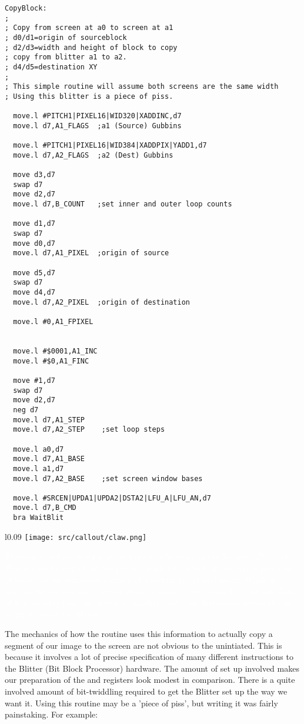 \clearpage
\begin{lstlisting}[escapechar=\%]
CopyBlock:
;
; Copy from screen at a0 to screen at a1
; d0/d1=origin of sourceblock
; d2/d3=width and height of block to copy
; copy from blitter a1 to a2.
; d4/d5=destination XY
;
; This simple routine will assume both screens are the same width
; Using this blitter is a piece of piss.

  move.l #PITCH1|PIXEL16|WID320|XADDINC,d7
  move.l d7,A1_FLAGS  ;a1 (Source) Gubbins

  move.l #PITCH1|PIXEL16|WID384|XADDPIX|YADD1,d7
  move.l d7,A2_FLAGS  ;a2 (Dest) Gubbins

  move d3,d7
  swap d7
  move d2,d7
  move.l d7,B_COUNT   ;set inner and outer loop counts

  move d1,d7
  swap d7
  move d0,d7
  move.l d7,A1_PIXEL  ;origin of source

  move d5,d7
  swap d7
  move d4,d7
  move.l d7,A2_PIXEL  ;origin of destination

  move.l #0,A1_FPIXEL


  move.l #$0001,A1_INC
  move.l #$0,A1_FINC

  move #1,d7
  swap d7
  move d2,d7
  neg d7
  move.l d7,A1_STEP
  move.l d7,A2_STEP    ;set loop steps

  move.l a0,d7
  move.l d7,A1_BASE
  move.l a1,d7
  move.l d7,A2_BASE    ;set screen window bases

  move.l #SRCEN|UPDA1|UPDA2|DSTA2|LFU_A|LFU_AN,d7
  move.l d7,B_CMD
  bra WaitBlit
\end{lstlisting}

\begin{definition}
\setlength{\intextsep}{0pt}%
\setlength{\columnsep}{3pt}%
\begin{wrapfigure}{l}{0.09\textwidth}
\texttt{[image: src/callout/claw.png]} 
\end{wrapfigure}
\small
\textcolor{white}{
  The source and destination are described as 'screens' in the Tempest 2000 code. This is a useful way of thinking of our pixel data, which
  although it is just a list of bytes, always represents a screen of a certain height and width. While in practice we are copying a section from an image
  to the screen here, we can think of it as copying from one screen to another - with the destination screen the one being shown to the player.
}
\end{definition}

The mechanics of how the  routine uses this information to actually copy a segment of our image
to the screen are not obvious to the unintiated. This is because it involves a lot of precise specification of many different
instructions to the Blitter (Bit Block Processor) hardware. The amount of set up involved makes our preparation of the 
and  registers look modest in comparison. There is a quite involved amount of bit-twiddling required to get the Blitter
set up the way we want it. Using this routine may be a 'piece of piss', but writing it was fairly painstaking. For example:

